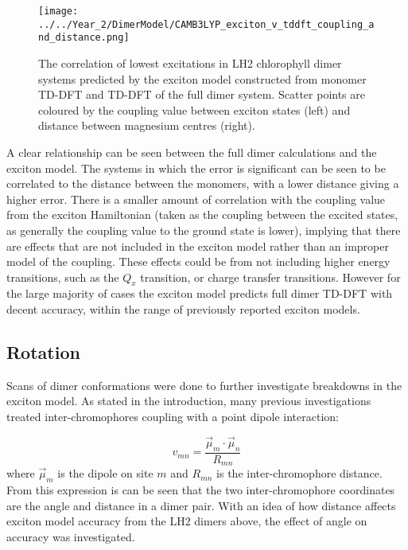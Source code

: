 \begin{figure}
    \centering
    \texttt{[image: ../../Year\_2/DimerModel/CAMB3LYP\_exciton\_v\_tddft\_coupling\_and\_distance.png]}
    \label{fig:camb3lyp_excitons}
    \caption{The correlation of lowest excitations in LH2 chlorophyll dimer systems
    predicted by the exciton model constructed from monomer TD-DFT and TD-DFT of
    the full dimer system. Scatter points are coloured by the coupling value between
    exciton states (left) and distance between magnesium centres (right).}
\end{figure}

A clear relationship can be seen between the full dimer calculations and the exciton
model. The systems in which the error is significant can be seen to be correlated
to the distance between the monomers, with a lower distance giving a higher error.
There is a smaller amount of correlation with the coupling value from the exciton
Hamiltonian (taken as the coupling between the excited states, as generally the 
coupling value to the ground state is lower), implying that there are effects that
are not included in the exciton model rather than an improper model of the coupling.
These effects could be from not including higher energy transitions, such as the $Q_x$ 
transition, or charge transfer transitions. However for the large majority of cases
the exciton model predicts full dimer TD-DFT with decent accuracy, within the range
of previously reported exciton models.

\subsection{Rotation}
\label{subsec:rotation}

Scans of dimer conformations were done to further investigate breakdowns in the
exciton model. As stated in the introduction, many previous investigations treated
inter-chromophores coupling with a point dipole interaction:

\begin{equation}
    v_{mn} = \frac{\vec{\mu}_m \cdot \vec{\mu}_n}{R_{mn}}
\end{equation}
%
where $\vec{\mu}_m$ is the dipole on site $m$ and $R_{mn}$ is the inter-chromophore
distance. From this expression is can be seen that the two inter-chromophore coordinates
are the angle and distance in a dimer pair. With an idea of how distance affects
exciton model accuracy from the LH2 dimers above, the effect of angle on accuracy
was investigated.

